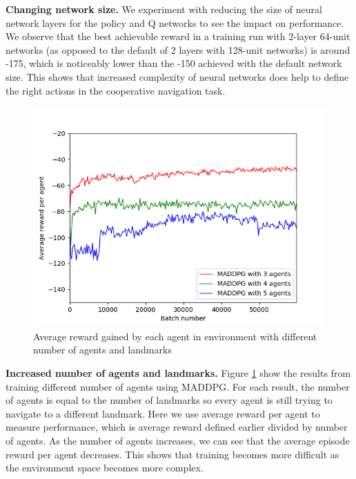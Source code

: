 \documentclass{article}
\begin{document}
\textbf{Changing network size.} We experiment with reducing the size of neural network layers for the policy and Q networks to see the impact on performance. We observe that the best achievable reward in a training run with 2-layer 64-unit networks (as opposed to the default of 2 layers with 128-unit networks) is around -175, which is noticeably lower than the -150 achieved with the default network size. This shows that increased complexity of neural networks does help to define the right actions in the cooperative navigation task. 

\begin{figure}
\begin{center}
\includegraphics[scale=0.5]{maddpg_3,4,5agents.png}
\end{center}
\caption{Average reward gained by each agent in environment with different number of agents and landmarks}
\label{fig:avg_reward_multiple_agents}
\end{figure}

\textbf{Increased number of agents and landmarks.} Figure \ref{fig:avg_reward_multiple_agents} show the results from training different number of agents using MADDPG. For each result, the number of agents is equal to the number of landmarks so every agent is still trying to navigate to a different landmark. Here we use average reward per agent to measure performance, which is average reward defined earlier divided by number of agents. As the number of agents increases, we can see that the average episode reward per agent decreases. This shows that training becomes more difficult as the environment space becomes more complex. 
\end{document}
